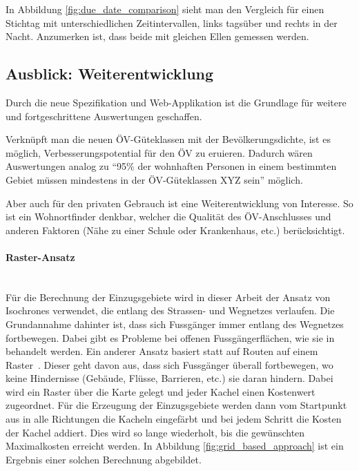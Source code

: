 In Abbildung \ref{fig:due_date_comparison} sieht man den Vergleich für einen Stichtag mit unterschiedlichen Zeitintervallen, links tagsüber und rechts in der Nacht.
Anzumerken ist, dass beide mit gleichen Ellen gemessen werden.

\subsection{Ausblick: Weiterentwicklung}
\label{Resultate:Ausblick: Weiterentwicklung}

Durch die neue Spezifikation und Web-Applikation ist die Grundlage für weitere und fortgeschrittene Auswertungen geschaffen.

Verknüpft man die neuen \acs{ÖV}-Güteklassen mit der Bevölkerungsdichte, ist es möglich, Verbesserungspotential für den \acs{ÖV} zu eruieren.
Dadurch wären Auswertungen analog zu "`95\% der wohnhaften Personen in einem bestimmten Gebiet müssen mindestens in der \acs{ÖV}-Güteklassen XYZ sein"' möglich.

Aber auch für den privaten Gebrauch ist eine Weiterentwicklung von Interesse.
So ist ein Wohnortfinder denkbar, welcher die Qualität des \acs{ÖV}-Anschlusses und anderen Faktoren (Nähe zu einer Schule oder Krankenhaus, etc.) berücksichtigt.

\paragraph{Raster-Ansatz}~\\
Für die Berechnung der Einzugsgebiete wird in dieser Arbeit der Ansatz von \glspl{Isochrone} verwendet, die entlang des Strassen- und Wegnetzes verlaufen.
Die Grundannahme dahinter ist, dass sich Fussgänger immer entlang des Wegnetzes fortbewegen.
Dabei gibt es Probleme bei offenen Fussgängerflächen, wie sie in~\cite{plaza_route} behandelt werden.
Ein anderer Ansatz basiert statt auf Routen auf einem Raster~\cite{pedestrian_accessibility_planning}. Dieser geht davon aus, dass sich Fussgänger überall fortbewegen, wo keine Hindernisse (Gebäude, Flüsse, Barrieren, etc.) sie daran hindern.
Dabei wird ein Raster über die Karte gelegt und jeder Kachel einen Kostenwert zugeordnet.
Für die Erzeugung der Einzugsgebiete werden dann vom Startpunkt aus in alle Richtungen die Kacheln eingefärbt und bei jedem Schritt die Kosten der Kachel addiert.
Dies wird so lange wiederholt, bis die gewünschten Maximalkosten erreicht werden.
In Abbildung \ref{fig:grid_based_approach} ist ein Ergebnis einer solchen Berechnung abgebildet.

